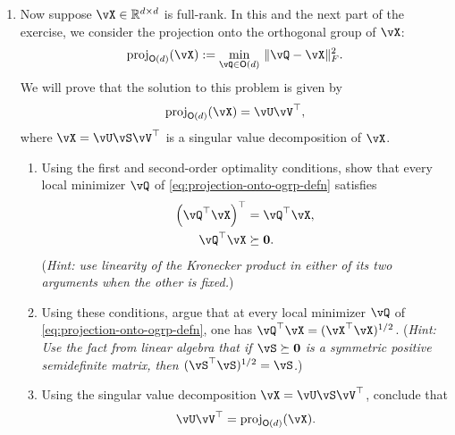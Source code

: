 \documentclass[../../book-main.tex]{subfiles}
\begin{document}
\begin{exercise}
\begin{enumerate}
        \item Now suppose $\vX \in \R^{d\times d}$ is full-rank. In this and the next part of the exercise, we consider the projection onto the orthogonal group of $\vX$:
        \begin{equation}\label{eq:projection-onto-ogrp-defn}
            \mathrm{proj}_{\O(d)}(\vX) :=
            \min_{\vQ \in \O(d)
            }\, \norm{\vQ - \vX}_F^2.
        \end{equation}
        We will prove that the solution to this problem is given by
        \begin{equation*}
            \mathrm{proj}_{\O(d)}(\vX)
            =
            \vU \vV^\top,
        \end{equation*}
        where $\vX = \vU \vS \vV^\top$ is a singular value decomposition of $\vX$. 

        \begin{enumerate}
            \item Using the first and second-order optimality conditions, show that every local minimizer $\vQ$ of \eqref{eq:projection-onto-ogrp-defn} satisfies
            \begin{align*}
                \left( \vQ^\top \vX \right)^\top &= \vQ^\top \vX, \\
                \vQ^\top \vX &\succeq \mathbf{0}.
            \end{align*}
            (\textit{Hint: use linearity of the Kronecker product in either of its two arguments when the other is fixed.})
            \item Using these conditions, argue that at every local minimizer $\vQ$ of \eqref{eq:projection-onto-ogrp-defn}, one has $\vQ^\top \vX = (\vX^\top \vX)^{1/2}$.
            (\textit{Hint: Use %
            the fact from linear algebra that if $\vS \succeq \mathbf{0}$ is a symmetric positive semidefinite matrix, then $(\vS^\top\vS)^{1/2} = \vS$.})
            \item Using the singular value decomposition $\vX = \vU \vS \vV^\top$, conclude that
            \begin{equation*}
                \vU \vV^\top
                =
                \mathrm{proj}_{\O(d)}(\vX).
            \end{equation*}
        \end{enumerate}
    \end{enumerate}
\end{exercise}
\end{document}
